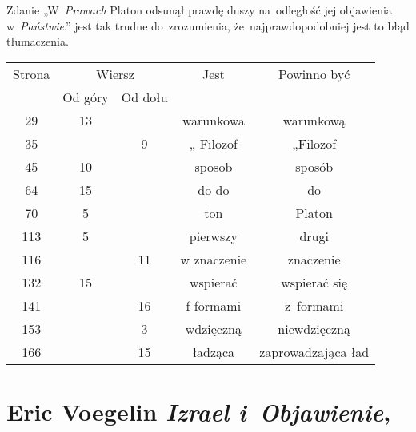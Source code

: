 \documentclass[a4paper,11pt]{article}
\numberwithin{equation}{section}
\begin{document}
\VerSpaceFour





\noindent
{} Zdanie „W~\textit{Prawach} Platon odsunął prawdę
duszy na~odległość jej objawienia w~\textit{Państwie}.” jest tak trudne
do~zrozumienia, że~najprawdopodobniej jest to błąd tłumaczenia.





\newpage



\begin{center}

  \begin{tabular}{|c|c|c|c|c|}
    \hline
    Strona & \multicolumn{2}{c|}{Wiersz} & Jest
                              & Powinno być \\ \cline{2-3}
    & Od góry & Od dołu & & \\
    \hline
    29  & 13 & & warunkowa & warunkową \\
    35  & &  9 & „ Filozof & „Filozof \\
    45  & 10 & & sposob & sposób \\
    64  & 15 & & do do & do \\
    70  &  5 & & ton & Platon \\
    113 &  5 & & pierwszy & drugi \\
    116 & & 11 & w znaczenie & znaczenie \\
    132 & 15 & & wspierać & wspierać się \\
    141 & & 16 & f formami & z~formami \\
    153 & &  3 & wdzięczną & niewdzięczną \\
    166 & & 15 & ładząca & zaprowadzająca ład \\
    \hline
  \end{tabular}

\end{center}

\VerSpaceTwo













\newpage

\section{Eric Voegelin \textit{Izrael i~Objawienie}, \cite{VoegelinIzraelIObjawienie2014}}
\end{document}
